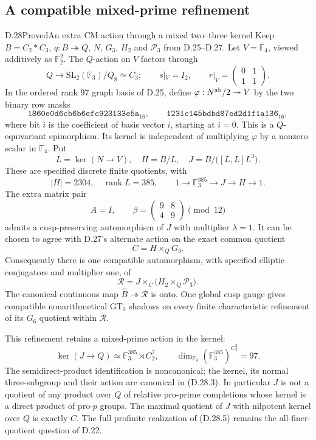 \subsection{A compatible mixed-prime refinement}

\begin{statement}{D.28}{Proved}{An extra CM action through a mixed two--three kernel}
Keep $B=C_2*C_3$, $q:B\twoheadrightarrow Q$, $N$, $G_3$,
$H_2$ and $\mathcal P_3$ from D.25--D.27. Let
$V=\mathbb F_4$, viewed additively as $\mathbb F_2^2$.
The $Q$-action on $V$ factors through
\[
 Q\longrightarrow \mathrm{SL}_2(\mathbb F_3)/Q_8\simeq C_3;
 \qquad s|_V=I_2,\qquad
 r|_V=\begin{pmatrix}0&1\\1&1\end{pmatrix}.              \tag{D.28.1}
\]
In the ordered rank 97 graph basis of D.25, define
$\varphi:N^{\rm ab}/2\twoheadrightarrow V$ by the two
binary row masks
\[
 \texttt{1860e0d6cb6b6efc923133e5a}_{16},\qquad
 \texttt{1231c145bdbd87ed2d1f1a136}_{16},                 \tag{D.28.2}
\]
where bit $i$ is the coefficient of basis vector $i$, starting
at $i=0$. This is a $Q$-equivariant epimorphism. Its kernel is
independent of multiplying $\varphi$ by a nonzero scalar in
$\mathbb F_4$. Put
\[
 L=\ker(N\longrightarrow V),\quad H=B/L,\quad
 J=B/\bigl([L,L]L^3\bigr).                              \tag{D.28.3}
\]
These are specified discrete finite quotients, with
\[
 |H|=2304,\quad \operatorname{rank}L=385,\qquad
 1\longrightarrow\mathbb F_3^{385}\longrightarrow J
       \longrightarrow H\longrightarrow1.             \tag{D.28.4}
\]
The extra matrix pair
\[
 A=I,\qquad \beta=\begin{pmatrix}9&8\\4&9\end{pmatrix}\pmod{12}
                                                               \tag{D.28.5}
\]
admits a cusp-preserving automorphism of $J$ with multiplier
$\lambda=1$. It can be chosen to agree with D.27's alternate
action on the exact common quotient
\[
                    C=H\times_QG_3.                   \tag{D.28.6}
\]
Consequently there is one compatible automorphism, with
specified elliptic conjugators and multiplier one, of
\[
 \mathcal R=J\times_C
          \bigl(H_2\times_Q\mathcal P_3\bigr).          \tag{D.28.7}
\]
The canonical continuous map $\widehat B\twoheadrightarrow
\mathcal R$ is onto. One global cusp gauge gives compatible
nonarithmetical GT$_0$ shadows on every finite characteristic
refinement of its $G_6$ quotient within $\mathcal R$.

This refinement retains a mixed-prime action in the kernel:
\[
 \ker(J\to Q)\simeq
        \mathbb F_3^{385}\rtimes C_2^2,\qquad
 \dim_{\mathbb F_3}(\mathbb F_3^{385})^{C_2^2}=97.       \tag{D.28.8}
\]
The semidirect-product identification is noncanonical; the
kernel, its normal three-subgroup and their action are
canonical in (D.28.3). In particular $J$ is not a quotient
of any product over $Q$ of relative pro-prime completions
whose kernel is a direct product of pro-$p$ groups. The
maximal quotient of $J$ with nilpotent kernel over $Q$ is
exactly $C$. The full profinite realization of (D.28.5)
remains the all-finer-quotient question of D.22.
\end{statement}
